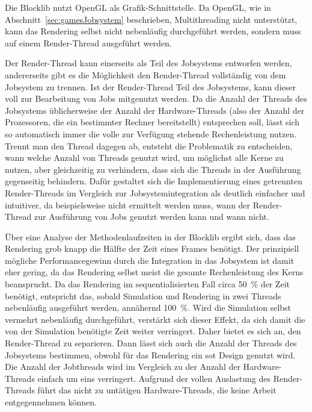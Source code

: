 
Die Blocklib nutzt OpenGL als Grafik-Schnittstelle. Da OpenGL, wie in Abschnitt~\ref{sec:gamesJobsystem} beschrieben, Multithreading nicht unterstützt, kann das Rendering selbst nicht nebenläufig durchgeführt werden, sondern muss auf einem Render-Thread ausgeführt werden.

Der Render-Thread kann einerseits als Teil des Jobsystems entworfen werden, andererseits gibt es die Möglichkeit den Render-Thread vollständig von dem Jobsystem zu trennen. Ist der Render-Thread Teil des Jobsystems, kann dieser voll zur Bearbeitung von Jobs mitgenutzt werden. Da die Anzahl der Threads des Jobsystems üblicherweise der Anzahl der Hardware-Threads (also der Anzahl der Prozessoren, die ein bestimmter Rechner bereitstellt) entsprechen soll, lässt sich so automatisch immer die volle zur Verfügung stehende Rechenleistung nutzen. Trennt man den Thread dagegen ab, entsteht die Problematik zu entscheiden, wann welche Anzahl von Threads genutzt wird, um möglichst alle Kerne zu nutzen, aber gleichzeitig zu verhindern, dass sich die Threads in der Ausführung gegenseitig behindern. Dafür gestaltet sich die Implementierung eines getrennten Render-Threads im Vergleich zur Jobsystemintegration als deutlich einfacher und intuitiver, da beispielsweise nicht ermittelt werden muss, wann der Render-Thread zur Ausführung von Jobs genutzt werden kann und wann nicht.

Über eine Analyse der Methodenlaufzeiten in der Blocklib ergibt sich, dass das Rendering grob knapp die Hälfte der Zeit eines Frames benötigt. Der prinzipiell mögliche Performancegewinn durch die Integration in das Jobsystem ist damit eher gering, da das Rendering selbst meist die gesamte Rechenleistung des Kerns beansprucht. Da das Rendering im sequentialisierten Fall circa \SI{50}{\percent} der Zeit benötigt, entspricht das, sobald Simulation und Rendering in zwei Threads nebenläufig ausgeführt werden, annähernd \SI{100}{\percent}. Wird die Simulation selbst vermehrt nebenläufig durchgeführt, verstärkt sich dieser Effekt, da sich damit die von der Simulation benötigte Zeit weiter verringert. Daher bietet es sich an, den Render-Thread zu separieren. Dann lässt sich auch die Anzahl der Threads des Jobsystems bestimmen, obwohl für das Rendering ein \ac{sot} Design genutzt wird. Die Anzahl der Jobthreads wird im Vergleich zu der Anzahl der Hardware-Threads einfach um eins verringert. Aufgrund der vollen Auslastung des Render-Threads führt das nicht zu untätigen Hardware-Threads, die keine Arbeit entgegennehmen können.


